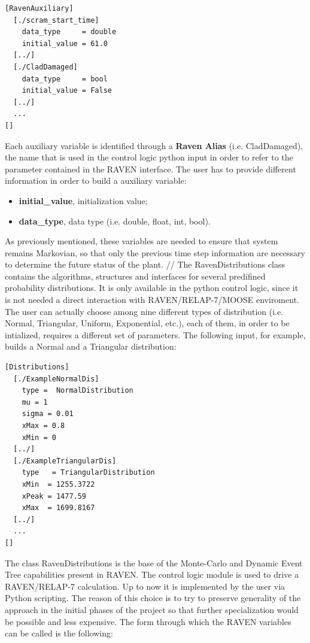 \documentclass{mc2013}
\begin{document}
\begin{lstlisting}
[RavenAuxiliary]
  [./scram_start_time]
    data_type     = double
    initial_value = 61.0
  [../]
  [./CladDamaged]
    data_type     = bool
    initial_value = False
  [../]  
  ...
[]
\end{lstlisting}
Each auxiliary variable is identified through a \textbf{Raven Alias} (i.e. CladDamaged), the name that is used in the control logic python input in order to refer to the parameter contained in the RAVEN interface.
The user has to provide different information in order to build a auxiliary variable:
\begin{itemize}
  \item \textbf{initial\_value}, initialization value;
  \item \textbf{data\_type}, data type (i.e. double, float, int, bool).
\end{itemize}
As previously mentioned, these variables are needed to ensure that system remains Markovian, so that only the previous time step information are necessary to determine the future status of the plant. 
// The RavenDistributions class contains the algorithms, structures and interfaces for several predifined probability distributions. It is only available in the python control logic, since it is not needed a direct interaction with RAVEN/RELAP-7/MOOSE enviroment. The user can actually choose among nine different types of distribution (i.e. Normal, Triangular, Uniform, Exponential, etc.), each of them, in order to be intialized, requires a different set of parameters.
The following input, for example, builds a Normal and a Triangular distribution:
\begin{lstlisting}
[Distributions]
  [./ExampleNormalDis]
    type =  NormalDistribution
    mu = 1
    sigma = 0.01
    xMax = 0.8
    xMin = 0
  [../]
  [./ExampleTriangularDis]
    type   = TriangularDistribution
    xMin  = 1255.3722 
    xPeak = 1477.59
    xMax  = 1699.8167 
  [../]
  ...
[]
\end{lstlisting}
The class RavenDistributions is the base of the Monte-Carlo and Dynamic Event Tree capabilities present in RAVEN. 
\label{sec:pythonControlLogic} 
The control logic module is used to drive a RAVEN/RELAP-7 calculation. Up to now it is implemented by the user via Python scripting. The reason of this choice is to try to preserve generality of the approach in the initial phases of the project so that further specialization would be possible and less expensive.  The form through which the RAVEN variables can be called is the following:
\end{document}
